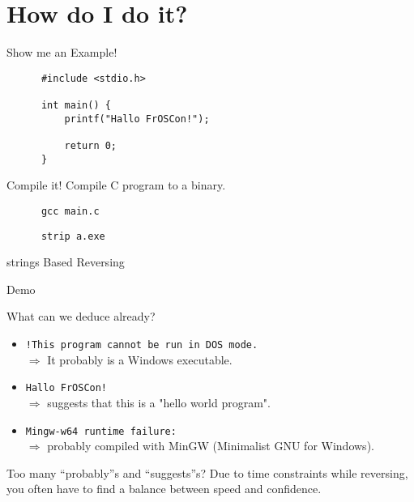 \documentclass{beamer}
\begin{document}
  \section{How do I do it?}
  \begin{frame}[fragile]{Show me an Example!}
    \pause
    \begin{lstlisting}
      #include <stdio.h>

      int main() {
          printf("Hallo FrOSCon!");

          return 0;
      }
  \end{lstlisting}
  \end{frame}

  \begin{frame}[fragile]{Compile it!}
    Compile C program to a binary.
    \begin{verbatim}
      gcc main.c
    \end{verbatim}
    \pause
    \begin{verbatim}
      strip a.exe
    \end{verbatim}
  \end{frame}

  \begin{frame}[fragile]{strings Based Reversing}
    \begin{center}
      Demo
    \end{center}
  \end{frame}

  \begin{frame}[fragile]{What can we deduce already?}
    \pause
    \begin{itemize}
      \item \verb|!This program cannot be run in DOS mode.|\pause\\ $\Rightarrow$ It probably is a Windows executable.\pause
      \item \verb|Hallo FrOSCon!|\pause\\ $\Rightarrow$ suggests that this is a "hello world program".\pause
      \item \verb|Mingw-w64 runtime failure:|\pause\\ $\Rightarrow$ probably compiled with MinGW (Minimalist GNU for Windows).\pause
    \end{itemize}
    \begin{alertblock}{Too many ``probably''s and ``suggests''s?}\pause
      Due to time constraints while reversing, you often have to find a balance between speed and confidence.
    \end{alertblock}
  \end{frame}
\end{document}
